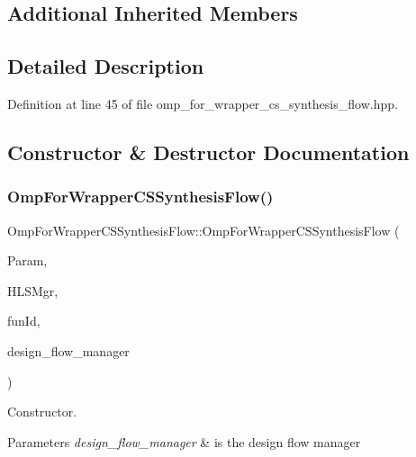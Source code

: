 \subsection*{Additional Inherited Members}


\subsection{Detailed Description}


Definition at line 45 of file omp\+\_\+for\+\_\+wrapper\+\_\+cs\+\_\+synthesis\+\_\+flow.\+hpp.



\subsection{Constructor \& Destructor Documentation}
\mbox{\label{classOmpForWrapperCSSynthesisFlow_a1b1c9f55d63acf1140c8c04c4aad9df1}} 
\subsubsection{\texorpdfstring{Omp\+For\+Wrapper\+C\+S\+Synthesis\+Flow()}{OmpForWrapperCSSynthesisFlow()}}
{\footnotesize\ttfamily Omp\+For\+Wrapper\+C\+S\+Synthesis\+Flow\+::\+Omp\+For\+Wrapper\+C\+S\+Synthesis\+Flow (\begin{DoxyParamCaption}\item[{const \hyperlink{Parameter_8hpp_a37841774a6fcb479b597fdf8955eb4ea}{Parameter\+Const\+Ref}}]{Param,  }\item[{const \hyperlink{hls__manager_8hpp_acd3842b8589fe52c08fc0b2fcc813bfe}{H\+L\+S\+\_\+manager\+Ref}}]{H\+L\+S\+Mgr,  }\item[{unsigned int}]{fun\+Id,  }\item[{const Design\+Flow\+Manager\+Const\+Ref}]{design\+\_\+flow\+\_\+manager }\end{DoxyParamCaption})}



Constructor. 


\begin{DoxyParams}{Parameters}
{\em design\+\_\+flow\+\_\+manager} & is the design flow manager \\
\hline
\end{DoxyParams}


